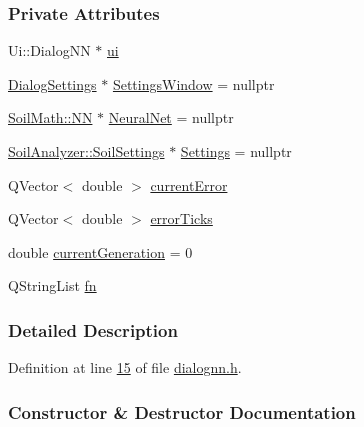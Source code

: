 \subsubsection*{Private Attributes}
\begin{DoxyCompactItemize}
\item 
Ui\+::\+Dialog\+N\+N $\ast$ \hyperlink{class_dialog_n_n_affd6ce2909be5826c52fd862d1963eee}{ui}
\item 
\hyperlink{class_dialog_settings}{Dialog\+Settings} $\ast$ \hyperlink{class_dialog_n_n_aeaad085b1b2c7e4613228aa612d725f4}{Settings\+Window} = nullptr
\item 
\hyperlink{class_soil_math_1_1_n_n}{Soil\+Math\+::\+N\+N} $\ast$ \hyperlink{class_dialog_n_n_a1d38f96a8f11697068e805fdaa3267b2}{Neural\+Net} = nullptr
\item 
\hyperlink{class_soil_analyzer_1_1_soil_settings}{Soil\+Analyzer\+::\+Soil\+Settings} $\ast$ \hyperlink{class_dialog_n_n_afdf8c81b845ec58a3f495c2dd3423377}{Settings} = nullptr
\item 
Q\+Vector$<$ double $>$ \hyperlink{class_dialog_n_n_a4ef13ab4b2de7e544686065a41ef1b74}{current\+Error}
\item 
Q\+Vector$<$ double $>$ \hyperlink{class_dialog_n_n_af0eb5fbc415d948bedf5120bdd256e1c}{error\+Ticks}
\item 
double \hyperlink{class_dialog_n_n_a886cc6b16f26f822a3a39ed7812f26a5}{current\+Generation} = 0
\item 
Q\+String\+List \hyperlink{class_dialog_n_n_ac37477ba2781da043e5b2ce9495ea45f}{fn}
\end{DoxyCompactItemize}


\subsubsection{Detailed Description}


Definition at line \hyperlink{dialognn_8h_source_l00015}{15} of file \hyperlink{dialognn_8h_source}{dialognn.\+h}.



\subsubsection{Constructor \& Destructor Documentation}
\hypertarget{class_dialog_n_n_a53065cfe16eeaf3cf1b1e94058738c3f}{}
